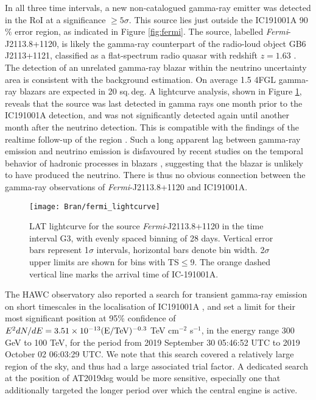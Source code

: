 In all three time intervals, a new non-catalogued gamma-ray emitter was detected in the RoI at a significance $\geq 5 \sigma$. This source lies just outside the IC191001A 90$\%$ error region, as indicated in Figure \ref{fig:fermi}. The source, labelled \textit{Fermi}-J2113.8+1120, is likely the gamma-ray counterpart of the radio-loud object GB6 J2113+1121, classified as a flat-spectrum radio quasar with redshift $z = 1.63$ . The detection of an unrelated gamma-ray blazar within the neutrino uncertainty area is consistent with the background estimation. On average 1.5 4FGL gamma-ray blazars are expected in 20 sq.\,deg. A lightcurve analysis, shown in Figure \ref{fig:fermi_lc}, reveals that the source was last detected in gamma rays one month prior to the IC191001A detection, and was not significantly detected again until another month after the neutrino detection. This is compatible with the findings of the realtime follow-up of the region \cite{2019GCN.25932....1G}. Such a long apparent lag between gamma-ray emission and neutrino emission is disfavoured by recent studies on the temporal behavior of hadronic processes in blazars , suggesting that the blazar is unlikely to have produced the neutrino. There is thus no obvious connection between the gamma-ray observations of \textit{Fermi}-J2113.8+1120 and IC191001A.

\begin{figure}
	\centering
	\texttt{[image: Bran/fermi\_lightcurve]}
	\caption{LAT lightcurve for the source \textit{Fermi}-J2113.8+1120 in the time interval G3, with evenly spaced binning of 28 days. Vertical error bars represent 1$\sigma$ intervals, horizontal bars denote bin width. 2$\sigma$ upper limits are shown for bins with TS$\leq$9. The orange dashed vertical line marks the arrival time of IC-191001A.}
	\label{fig:fermi_lc}
\end{figure}

The HAWC observatory also reported a search for transient gamma-ray emission on short timescales in the localisation of IC191001A , and set a limit for their most significant position at 95\% confidence of $E^{2} dN/dE = 3.51 \times 10^{-13} (\textup{E}/\textup{TeV})^{-0.3}$ TeV cm$^{-2}$ s$^{-1}$, in the energy range 300 GeV to 100 TeV, for the period from 2019 September 30 05:46:52 UTC to 2019 October 02 06:03:29 UTC. We note that this search covered a relatively large region of the sky, and thus had a large associated trial factor. A dedicated search at the position of AT2019dsg would be more sensitive, especially one that additionally targeted the longer period over which the central engine is active.

